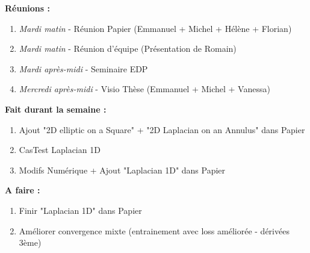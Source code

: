 \textbf{Réunions :}
\begin{enumerate}[label=\textbullet]
	\item \textit{Mardi matin} - Réunion Papier (Emmanuel + Michel + Hélène + Florian)
	\item \textit{Mardi matin} - Réunion d'équipe (Présentation de Romain)
	\item \textit{Mardi après-midi} - Seminaire EDP
	\item \textit{Mercredi après-midi} - Visio Thèse (Emmanuel + Michel + Vanessa)
\end{enumerate}
\textbf{Fait durant la semaine :}
\begin{enumerate}[label=\textbullet]
	\item Ajout "2D elliptic on a Square" + "2D Laplacian on an Annulus" dans Papier
	\item CasTest Laplacian 1D
	\item Modifs Numérique + Ajout "Laplacian 1D" dans Papier
\end{enumerate}
\textbf{A faire :}
\begin{enumerate}[label=\textbullet]
	\item Finir "Laplacian 1D" dans Papier
	\item Améliorer convergence mixte (entrainement avec loss améliorée - dérivées 3ème)
\end{enumerate}